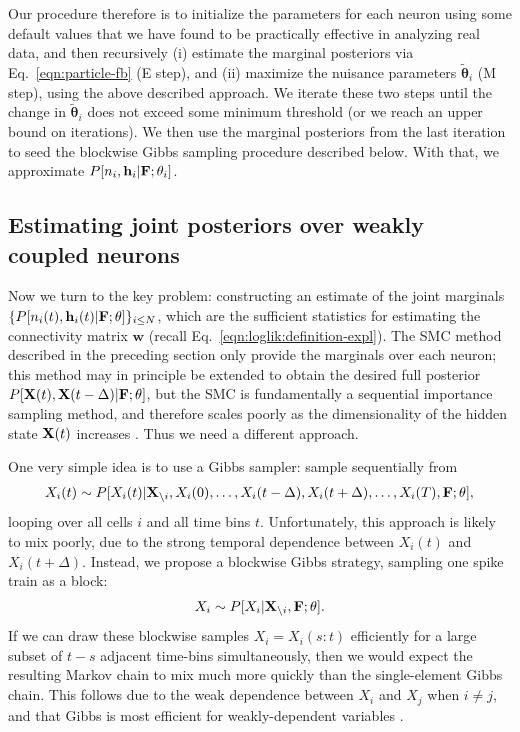 \documentclass[aoas,preprint]{imsart}
\renewcommand{\i}{\backslash i}
\newcommand{\bth}{\mathbf{\theta}}
\newcommand{\w}{w}
\newcommand{\bw}{\mathbf{\w}}
\newcommand{\bF}{{\bf F}}
\newcommand{\bX}{{\bf X}}
\newcommand{\bh}{\mathbf{h}}
\newcommand{\tbth}{\tilde{\bth}}
\begin{document}
Our procedure therefore is to initialize the parameters for each neuron using some default values that we have found to be practically effective in analyzing real data, and then recursively (i) estimate the marginal posteriors via Eq.~\eqref{eqn:particle-fb} (E step), and (ii) maximize the nuisance parameters $\tbth_i$ (M step), using the above described approach. We iterate these two steps until the change in $\tbth_i$ does not exceed some minimum threshold (or we reach an upper bound on iterations). We then use the marginal posteriors from the last iteration to seed the blockwise Gibbs sampling procedure described below. With that, we approximate $P[n_i,\bh_i | \bF;\bth_i]$.

\subsection{Estimating joint posteriors over weakly coupled neurons}
\label{sec:methods:joint}

Now we turn to the key problem: constructing an estimate of the joint marginals $\{P[n_i(t), \bh_i(t) | \bF;\bth]\}_{i\leq N}$, which are the sufficient statistics for estimating the connectivity matrix $\bw$ (recall Eq.~\eqref{eqn:loglik:definition-expl}). The SMC method described in the preceding section only provide the marginals over each neuron; this method may in principle be extended to obtain the desired full posterior $P[\bX(t), \bX(t-\Delta) | \bF; \bth]$, but the SMC is fundamentally a sequential importance sampling method, and therefore scales poorly as the dimensionality of the hidden state $\bX(t)$ increases \cite{BickelBengtsson08}. Thus we need a different approach.

One very simple idea is to use a Gibbs sampler: sample sequentially
from
\begin{align}
X_i(t) \sim P[X_i(t) | \bX_{\i}, X_i(0), \ldots, X_i(t-\Delta),
 X_i(t+\Delta), \ldots, X_i(T), \bF; \bth],
\end{align}
looping over all cells $i$ and all time bins $t$. Unfortunately, this approach is likely to mix poorly, due to the strong temporal dependence between $X_i(t)$ and $X_i(t+\Delta)$. Instead, we propose a blockwise Gibbs strategy, sampling one spike train as a block:
\begin{align}
	X_i \sim P[X_i | \bX_{\i}, \bF; \bth].
\end{align}
If we can draw these blockwise samples $X_i = X_i(s:t)$ efficiently for a large subset of $t-s$ adjacent time-bins simultaneously, then we would expect the resulting Markov chain to mix much more quickly than the single-element Gibbs chain.  This follows due to the weak dependence between $X_i$ and $X_j$ when $i\neq j$, and that Gibbs is most efficient for weakly-dependent variables \cite{RC05}.
\end{document}
